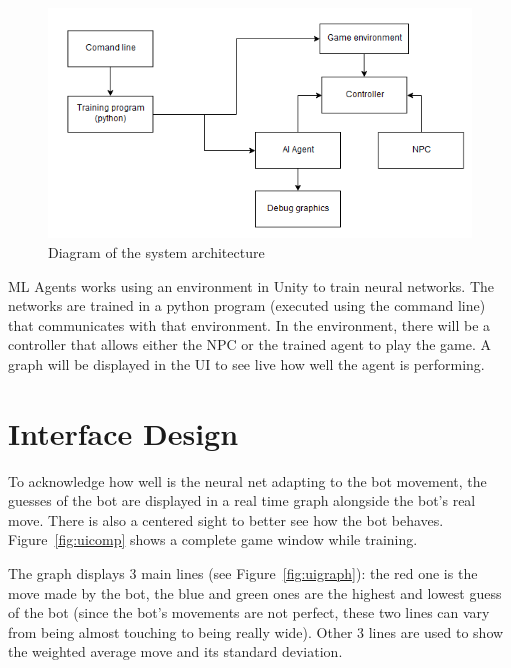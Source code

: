 \begin{figure}[h]
  \centering
		\includegraphics[width=.8\textwidth]{img/systemArchitecture.png}
  \caption{Diagram of the system architecture}
  \label{fig:architecture}
\end{figure}

ML Agents works using an environment in Unity to train neural networks. The networks are trained in a python program (executed using the command line) that communicates with that environment. In the environment, there will be a controller that allows either the NPC or the trained agent to play the game. A graph will be displayed in the UI to see live how well the agent is performing.

\section{Interface Design}

To acknowledge how well is the neural net adapting to the bot movement, the guesses of the bot are displayed in a real time graph alongside the bot's real move. There is also a centered sight to better see how the bot behaves. Figure~\ref{fig:uicomp} shows a complete game window while training.

The graph displays 3 main lines (see Figure~\ref{fig:uigraph}): the red one is the move made by the bot, the blue and green ones are the highest and lowest guess of the bot (since the bot's movements are not perfect, these two lines can vary from being almost touching to being really wide). Other 3 lines are used to show the weighted average move and its standard deviation.

